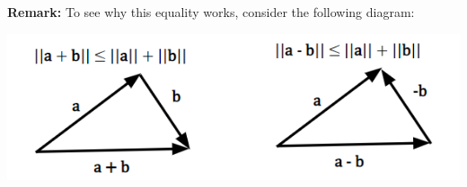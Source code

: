 \documentclass[letterpaper]{article}
\newcommand{\0}{\mathbf{0}}
\renewcommand{\b}{\mathbf{b}}
\newcommand{\x}{\mathbf{x}}
\begin{document}

\textbf{Remark:} To see why this equality works, consider the following diagram:
\begin{center}
    \includegraphics[scale=0.8]{assets/triangle_min_plu.png}
\end{center}
\end{document}
